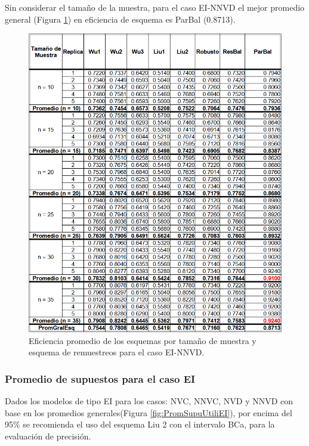 Sin considerar el tamaño de la muestra, para el caso EI-NNVD el mejor promedio general (Figura \ref{fig:EficPromEsqTamMuesEsqRemuEI-NNVD}) en eficiencia de esquema es ParBal (0.8713).


\begin{figure}[ht] 
	\centering 
	\includegraphics[width=0.70\linewidth]{img/EI_NNVD_Efic_Esq.png} 
	\caption{Eficiencia promedio de los esquemas por tamaño de muestra y esquema de remuestreos para el caso EI-NNVD.} 
	\label{fig:EficPromEsqTamMuesEsqRemuEI-NNVD}
\end{figure}
\FloatBarrier



\subsubsection{Promedio de supuestos para el caso EI}
Dados los modelos de tipo EI para los casos: NVC, NNVC, NVD y NNVD con base en los promedios generales(Figura \ref{fig:PromSupuUtiliEI}), por encima del 95\% se recomienda el uso del esquema Liu 2 con el intervalo BCa, para la evaluación de precisión.


